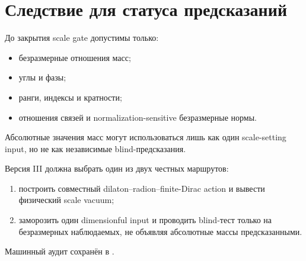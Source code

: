 \section{Следствие для статуса предсказаний}

До закрытия scale gate допустимы только:
\begin{itemize}
 \item безразмерные отношения масс;
 \item углы и фазы;
 \item ранги, индексы и кратности;
 \item отношения связей и normalization-sensitive безразмерные нормы.
\end{itemize}
Абсолютные значения масс могут использоваться лишь как один scale-setting
input, но не как независимые blind-предсказания.

\begin{protocol}
Версия III должна выбрать один из двух честных маршрутов:
\begin{enumerate}
 \item построить совместный dilaton--radion--finite-Dirac action и вывести
 физический scale vacuum;
 \item заморозить один dimensionful input и проводить blind-тест только на
 безразмерных наблюдаемых, не объявляя абсолютные массы предсказанными.
\end{enumerate}
\end{protocol}

Машинный аудит сохранён в
.